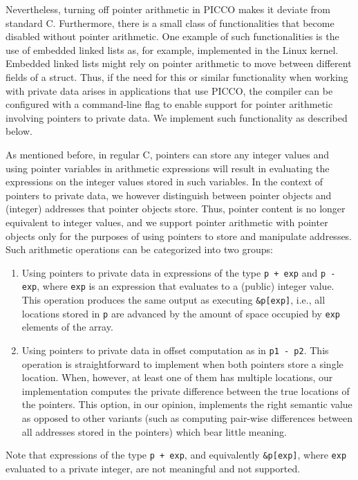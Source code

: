 \documentclass[11pt]{article}
\begin{document}
Nevertheless, turning off pointer arithmetic in PICCO makes it deviate from
standard C. Furthermore, there is a small class of functionalities that
become disabled without pointer arithmetic. One example of such
functionalities is the use of embedded linked lists as, for example,
implemented in the Linux kernel. Embedded linked lists might rely on pointer
arithmetic to move between different fields of a struct. Thus, if the need
for this or similar functionality when working with private data arises in
applications that use PICCO, the compiler can be configured with a
command-line flag to enable support for pointer arithmetic involving
pointers to private data. We implement such functionality as described below.

As mentioned before, in regular C, pointers can store any integer values and
using pointer variables in arithmetic expressions will result in evaluating
the expressions on the integer values stored in such variables. In the
context of pointers to private data, we however distinguish between pointer
objects and (integer) addresses that pointer objects store. Thus, pointer
content is no longer equivalent to integer values, and we support pointer
arithmetic with pointer objects only for the purposes of using pointers to
store and manipulate addresses. Such arithmetic operations can be
categorized into two groups:

\begin{enumerate}
  \item Using pointers to private data in expressions of the type \texttt{p
      + exp} and \texttt{p - exp}, where \texttt{exp} is an expression that
      evaluates to a (public) integer value. This operation produces the
      same output as executing \texttt{\&p[exp]}, i.e., all locations stored
      in \texttt{p} are advanced by the amount of space occupied by
      \texttt{exp} elements of the array.
  \item Using pointers to private data in offset computation as in
    \texttt{p1 - p2}. This operation is straightforward to implement when
    both pointers store a single location. When, however, at least one of
    them has multiple locations, our implementation computes the private
    difference between the true locations of the pointers. This option, in
    our opinion, implements the right semantic value as opposed to other
    variants (such as computing pair-wise differences between all addresses
    stored in the pointers) which bear little meaning.
\end{enumerate}
Note that expressions of the type \texttt{p + exp}, and equivalently
\texttt{\&p[exp]}, where \texttt{exp} evaluated to a private integer, are
not meaningful and not supported. 
\end{document}
